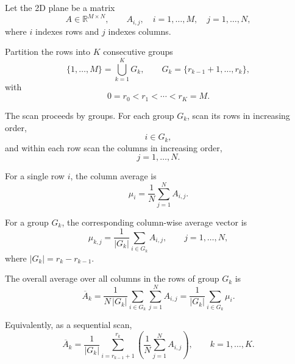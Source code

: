 \documentclass{article}
\begin{document}
Let the 2D plane be a matrix
\[
  A \in \mathbb{R}^{M \times N},
  \qquad A_{i,j},\quad i=1,\dots,M,\quad j=1,\dots,N,
\]
where \(i\) indexes rows and \(j\) indexes columns.

Partition the rows into \(K\) consecutive groups
\[
  \{1,\dots,M\} = \bigcup_{k=1}^{K} G_k,
  \qquad
  G_k = \{r_{k-1}+1,\dots,r_k\},
\]
with
\[
  0 = r_0 < r_1 < \cdots < r_K = M.
\]

The scan proceeds by groups. For each group \(G_k\), scan its rows in increasing order,
\[
  i \in G_k,
\]
and within each row scan the columns in increasing order,
\[
  j = 1,\dots,N.
\]

For a single row \(i\), the column average is
\[
  \mu_i
  =
  \frac{1}{N}\sum_{j=1}^{N} A_{i,j}.
\]

For a group \(G_k\), the corresponding column-wise average vector is
\[
  \mu_{k,j}
  =
  \frac{1}{|G_k|}
  \sum_{i\in G_k} A_{i,j},
  \qquad j=1,\dots,N,
\]
where \(|G_k| = r_k-r_{k-1}\).

The overall average over all columns in the rows of group \(G_k\) is
\[
  \overline{A}_k
  =
  \frac{1}{N\,|G_k|}
  \sum_{i\in G_k}\sum_{j=1}^{N} A_{i,j}
  =
  \frac{1}{|G_k|}
  \sum_{i\in G_k} \mu_i.
\]

Equivalently, as a sequential scan,
\[
  \overline{A}_k
  =
  \frac{1}{|G_k|}
  \sum_{i=r_{k-1}+1}^{r_k}
  \left(
    \frac{1}{N}\sum_{j=1}^{N} A_{i,j}
  \right),
  \qquad k=1,\dots,K.
\]
\end{document}
